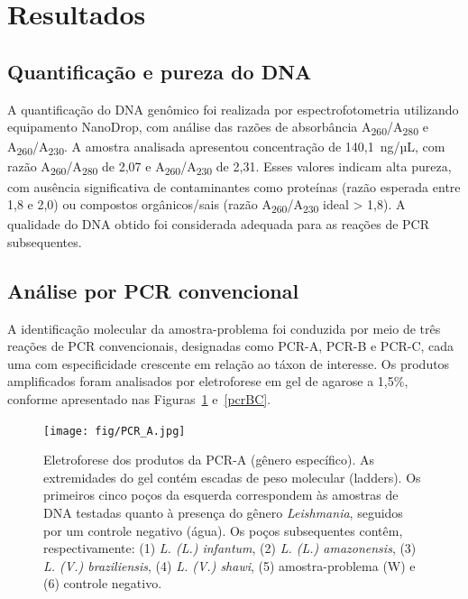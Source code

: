 \section{Resultados}

\subsection{Quantificação e pureza do DNA}
A quantificação do DNA genômico foi realizada por espectrofotometria utilizando equipamento NanoDrop, 
com análise das razões de absorbância A\textsubscript{260}/A\textsubscript{280} e A\textsubscript{260}/A\textsubscript{230}. 
A amostra analisada apresentou concentração de 140{,}1~ng/µL, com razão A\textsubscript{260}/A\textsubscript{280} de 2{,}07 e 
A\textsubscript{260}/A\textsubscript{230} de 2{,}31. Esses valores indicam alta pureza, com ausência significativa de contaminantes 
como proteínas (razão esperada entre 1{,}8 e 2{,}0) ou compostos orgânicos/sais (razão A\textsubscript{260}/A\textsubscript{230} 
ideal > 1{,}8)\cite{Alguém}. A qualidade do DNA obtido foi considerada adequada para as reações de PCR subsequentes.

\subsection{Análise por PCR convencional}
A identificação molecular da amostra-problema foi conduzida por meio de três reações de PCR convencionais, designadas como PCR-A, PCR-B 
e PCR-C, cada uma com especificidade crescente em relação ao táxon de interesse. Os produtos amplificados foram analisados por eletroforese 
em gel de agarose a 1{,}5\%, conforme apresentado nas Figuras~\ref{pcrA} e~\ref{pcrBC}.

\begin{figure}
 \centering
 \texttt{[image: fig/PCR\_A.jpg]}
 \caption{Eletroforese dos produtos da PCR-A (gênero específico). As extremidades do gel contém escadas de peso molecular (ladders). 
 Os primeiros cinco poços da esquerda correspondem às amostras de DNA testadas quanto à presença do gênero \textit{Leishmania}, 
 seguidos por um controle negativo (água). Os poços subsequentes contêm, respectivamente: (1) \textit{L. (L.) infantum}, 
 (2) \textit{L. (L.) amazonensis}, (3) \textit{L. (V.) braziliensis}, (4) \textit{L. (V.) shawi}, (5) amostra-problema (W) e (6) controle negativo.}
 \label{pcrA}
 \end{figure}


